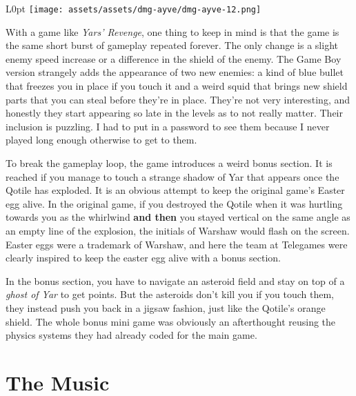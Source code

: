 \documentclass{book}
\let\oldcenter\center
\let\oldendcenter\endcenter
\renewenvironment{center}{\setlength\topsep{0pt}\oldcenter}{\oldendcenter}
\begin{document}
\begin{wrapfigure}{L}{0pt} \texttt{[image: assets/assets/dmg-ayve/dmg-ayve-12.png]}\end{wrapfigure}
With a game like \emph{Yars’ Revenge}, one thing to keep in mind is that the game is the same short burst of gameplay repeated forever. The only change is a slight enemy speed increase or a difference in the shield of the enemy. The Game Boy version strangely adds the appearance of two new enemies: a kind of blue bullet that freezes you in place if you touch it and a weird squid that brings new shield parts that you can steal before they’re in place. They’re not very interesting, and honestly they start appearing so late in the levels as to not really matter. Their inclusion is puzzling. I had to put in a password to see them because I never played long enough otherwise to get to them.

\begin{center}
\vspace{8pt}
\quad\vspace{4pt}
\end{center}

To break the gameplay loop, the game introduces a weird bonus section. It is reached if you manage to touch a strange shadow of Yar that appears once the Qotile has exploded. It is an obvious attempt to keep the original game’s Easter egg alive. In the original game, if you destroyed the Qotile when it was hurtling towards you as the whirlwind \textbf{and then} you stayed vertical on the same angle as an empty line of the explosion, the initials of Warshaw would flash on the screen. Easter eggs were a trademark of Warshaw, and here the team at Telegames were clearly inspired to keep the easter egg alive with a bonus section.

In the bonus section, you have to navigate an asteroid field and stay on top of a \emph{ghost of Yar} to get points. But the asteroids don’t kill you if you touch them, they instead push you back in a jigsaw fashion, just like the Qotile’s orange shield. The whole bonus mini game was obviously an afterthought reusing the physics systems they had already coded for the main game.

\FloatBarrier\needspace{5pt}\section*{The Music}\nopagebreak[4]
\end{document}
